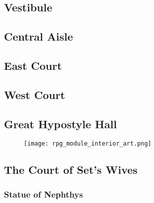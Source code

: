 \documentclass[a4paper,serif]{rpg-module}
\begin{document}
\subsection{Vestibule} %

\begin{boxtext}
\lipsum[1]
\end{boxtext}

\lipsum[2]

\subsection{Central Aisle} %

\begin{boxtext}
\lipsum[3]
\end{boxtext}

\lipsum[4]

\subsection{East Court} %

\lipsum[5]

\subsection{West Court} %

\lipsum[6]

\subsection{Great Hypostyle Hall} %
\label{hypostyle_hall}


\begin{figure}[t]
\texttt{[image: rpg\_module\_interior\_art.png]}
\label{img:tomb}
\end{figure}

\lipsum[7-8]

\subsection{The Court of Set's Wives} %

\lipsum[9]

\subsubsection{Statue of Nephthys} %
\label{west_court}
\end{document}
